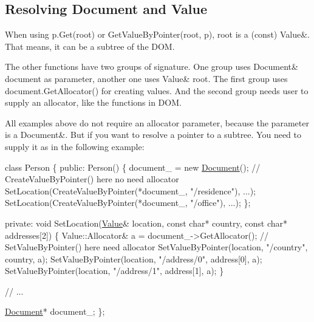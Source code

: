 \subsection*{Resolving Document and Value}

When using {\ttfamily p.\+Get(root)} or {\ttfamily Get\+Value\+By\+Pointer(root, p)}, {\ttfamily root} is a (const) {\ttfamily Value\&}. That means, it can be a subtree of the D\+OM.

The other functions have two groups of signature. One group uses {\ttfamily Document\& document} as parameter, another one uses {\ttfamily Value\& root}. The first group uses {\ttfamily document.\+Get\+Allocator()} for creating values. And the second group needs user to supply an allocator, like the functions in D\+OM.

All examples above do not require an allocator parameter, because the parameter is a {\ttfamily Document\&}. But if you want to resolve a pointer to a subtree. You need to supply it as in the following example\+:


\begin{DoxyCode}
\textcolor{keyword}{class }Person \{
\textcolor{keyword}{public}:
    Person() \{
        document\_ = \textcolor{keyword}{new} \hyperlink{document_8h_ac6ea5b168e3fe8c7fa532450fc9391f7}{Document}();
        \textcolor{comment}{// CreateValueByPointer() here no need allocator}
        SetLocation(CreateValueByPointer(*document\_, \textcolor{stringliteral}{"/residence"}), ...);
        SetLocation(CreateValueByPointer(*document\_, \textcolor{stringliteral}{"/office"}), ...);
    \};

\textcolor{keyword}{private}:
    \textcolor{keywordtype}{void} SetLocation(\hyperlink{class_generic_value}{Value}& location, \textcolor{keyword}{const} \textcolor{keywordtype}{char}* country, \textcolor{keyword}{const} \textcolor{keywordtype}{char}* addresses[2]) \{
        Value::Allocator& a = document\_->GetAllocator();
        \textcolor{comment}{// SetValueByPointer() here need allocator}
        SetValueByPointer(location, \textcolor{stringliteral}{"/country"}, country, a);
        SetValueByPointer(location, \textcolor{stringliteral}{"/address/0"}, address[0], a);
        SetValueByPointer(location, \textcolor{stringliteral}{"/address/1"}, address[1], a);
    \}

    \textcolor{comment}{// ...}

    \hyperlink{class_generic_document}{Document}* document\_;
\};
\end{DoxyCode}


